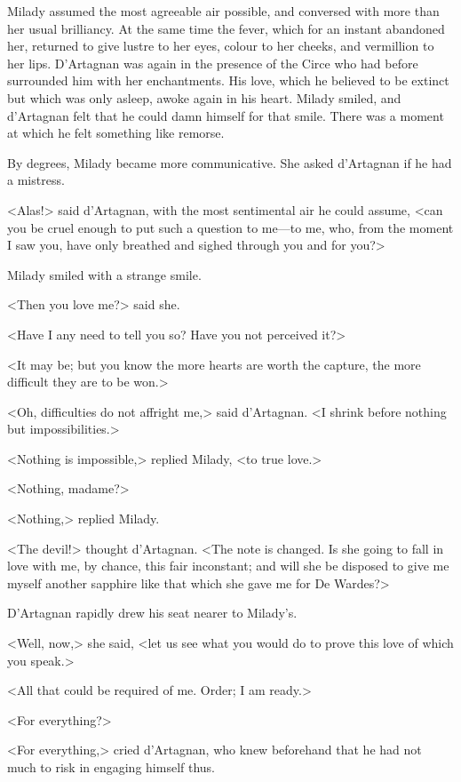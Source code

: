 Milady assumed the most agreeable air possible, and conversed with more than her usual brilliancy. At the same time the fever, which for an instant abandoned her, returned to give lustre to her eyes, colour to her cheeks, and vermillion to her lips. D'Artagnan was again in the presence of the Circe who had before surrounded him with her enchantments. His love, which he believed to be extinct but which was only asleep, awoke again in his heart. Milady smiled, and d'Artagnan felt that he could damn himself for that smile. There was a moment at which he felt something like remorse. 

By degrees, Milady became more communicative. She asked d'Artagnan if he had a mistress. 

<Alas!> said d'Artagnan, with the most sentimental air he could assume, <can you be cruel enough to put such a question to me---to me, who, from the moment I saw you, have only breathed and sighed through you and for you?> 

Milady smiled with a strange smile. 

<Then you love me?> said she. 

<Have I any need to tell you so? Have you not perceived it?> 

<It may be; but you know the more hearts are worth the capture, the more difficult they are to be won.> 

<Oh, difficulties do not affright me,> said d'Artagnan. <I shrink before nothing but impossibilities.> 

<Nothing is impossible,> replied Milady, <to true love.> 

<Nothing, madame?> 

<Nothing,> replied Milady. 

<The devil!> thought d'Artagnan. <The note is changed. Is she going to fall in love with me, by chance, this fair inconstant; and will she be disposed to give me myself another sapphire like that which she gave me for De Wardes?> 

D'Artagnan rapidly drew his seat nearer to Milady's. 

<Well, now,> she said, <let us see what you would do to prove this love of which you speak.> 

<All that could be required of me. Order; I am ready.> 

<For everything?> 

<For everything,> cried d'Artagnan, who knew beforehand that he had not much to risk in engaging himself thus. 

